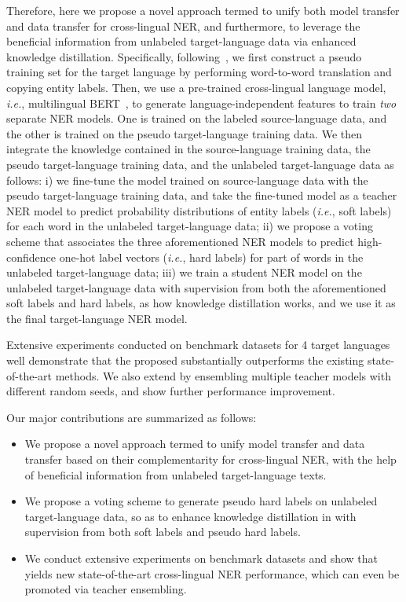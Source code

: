 \documentclass{article}
\newcommand\ie{\textit{i.e.}}
\newcommand\unitrans{\text{UniTrans}}
\begin{document}
Therefore, here we propose a novel approach termed \unitrans{}  to unify both model transfer and data transfer for cross-lingual NER, and furthermore, to leverage the beneficial information from unlabeled target-language data via enhanced knowledge distillation.
Specifically, following~\cite{lample2018word}, we first construct a pseudo training set for the target language by performing word-to-word translation and copying entity labels. 
Then, we use a pre-trained cross-lingual language model, \ie, multilingual BERT~\cite{devlin2019bert}, to generate language-independent features to train \emph{two} separate NER models. One is trained on the labeled source-language data, and the other is trained on the pseudo target-language training data. 
We then integrate the knowledge contained in the source-language training data, the pseudo target-language training data, and the unlabeled target-language data as follows: 
i) we fine-tune the model trained on source-language data with the pseudo target-language training data, and take the fine-tuned model as a teacher NER model to predict probability distributions of entity labels (\ie, soft labels) for each word in the unlabeled target-language data;
ii) we propose a voting scheme that associates the three aforementioned NER models to predict high-confidence one-hot label vectors (\ie{}, hard labels) for part of words in the unlabeled target-language data; 
iii) we train a student NER model on the unlabeled target-language data with supervision from both the aforementioned soft labels and hard labels, as how knowledge distillation works, and we use it as the final target-language NER model.


Extensive experiments conducted on benchmark datasets for 4 target languages well demonstrate that the proposed \unitrans{} substantially outperforms the existing state-of-the-art methods. We also extend \unitrans{} by ensembling multiple teacher models with different random seeds, and show further performance improvement.

Our major contributions are summarized as follows:
\begin{itemize}
    \item We propose a novel approach termed \unitrans{} to unify model transfer and data transfer based on their complementarity for cross-lingual NER, with the help of beneficial information from unlabeled target-language texts.
    \item We propose a voting scheme to generate pseudo hard labels on unlabeled target-language data, so as to enhance knowledge distillation in \unitrans{} with supervision from both soft labels and pseudo hard labels. \item We conduct extensive experiments on benchmark datasets and show that \unitrans{} yields new state-of-the-art cross-lingual NER performance, which can even be promoted via teacher ensembling. 
\end{itemize}
\end{document}
